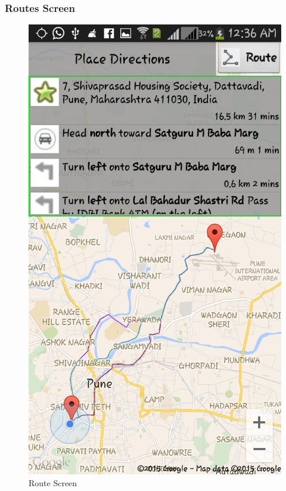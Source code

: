 \documentclass[12pt,a4paper]{article}
\begin{document}
\subsubsection{Routes Screen}
\begin{figure}[!htb]
\centering
\includegraphics[width=12 cm]{route}
\caption{Route Screen}
\end{figure}
\\
\end{document}
